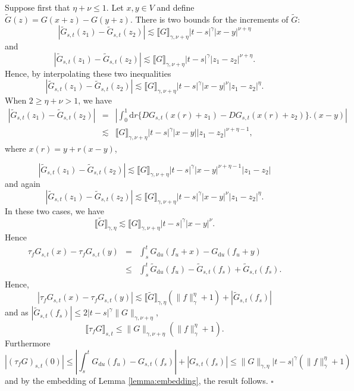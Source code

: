 \documentclass[a4paper,11pt]{article}
\newcommand{\mathd}{\mathrm{d}}
\newenvironment{proof}{{\sc Proof.}}{\hfill$\square$}
\begin{document}
\begin{proof}
  Suppose first that $\eta + \nu \leqslant 1$. Let $x,y \in V$ and define
  $\tilde{G} ( z ) =G ( x+z ) -G ( y+z )$. There is two bounds for the
  increments of $\tilde{G}$:
  \[ | \tilde{G}_{s,t} ( z_{1} ) - \tilde{G}_{s,t} ( z_{2} ) | \lesssim
     \llbracket G \rrbracket_{\gamma , \nu + \eta} | t-s |^{\gamma} | x-y
     |^{\nu + \eta} \]
  and
  \[ | \tilde{G}_{s,t} ( z_{1} ) - \tilde{G}_{s,t} ( z_{2} ) | \lesssim
     \llbracket G \rrbracket_{\gamma , \nu + \eta} | t-s |^{\gamma} | z_{1}
     -z_{2} |^{\nu + \eta} . \]
  Hence, by interpolating these two inequalities
  \[ | \tilde{G}_{s,t} ( z_{1} ) - \tilde{G}_{s,t} ( z_{2} ) | \lesssim
     \llbracket G \rrbracket_{\gamma , \nu + \eta} | t-s |^{\gamma} | x-y
     |^{\nu} | z_{1} -z_{2} |^{\eta} . \]
  When $2 \geqslant \eta + \nu >1$, we have
  \begin{eqnarray*}
    | \tilde{G}_{s,t} ( z_{1} ) - \tilde{G}_{s,t} ( z_{2} ) | & = & \left\lvert
    \int_{0}^{1} \mathd r  \{ D G_{s,t} ( x(r) +z_{1}  ) -D G_{s,t} ( x(r) +z_{2} ) \} .(x-y) \right\lvert\\
    & \lesssim & \llbracket G \rrbracket_{\gamma , \nu + \eta} | t-s
    |^{\gamma} | x-y | | z_{1} -z_{2} |^{\nu + \eta -1},
  \end{eqnarray*}
  where $x(r) = y+r(x-y)$,
  
  \[ | \tilde{G}_{s,t} ( z_{1} ) - \tilde{G}_{s,t} ( z_{2} ) | \lesssim
     \llbracket G \rrbracket_{\gamma , \nu + \eta} | t-s |^{\gamma} | x-y
     |^{\nu + \eta -1} | z_{1} -z_{2} | \]
  and again
  \[ | \tilde{G}_{s,t} ( z_{1} ) - \tilde{G}_{s,t} ( z_{2} ) | \lesssim
     \llbracket G \rrbracket_{\gamma , \nu + \eta} | t-s |^{\gamma} | x-y
     |^{\nu} | z_{1} -z_{2} |^{\eta} . \]
  In these two cases, we have
  \[ \llbracket \tilde{G} \rrbracket_{\gamma , \eta} \lesssim \llbracket G
     \rrbracket_{\gamma , \nu + \eta} | t-s |^{\gamma} | x-y |^{\nu} . \]
  Hence
  \begin{eqnarray*}
    \tau_{f} G_{s,t} ( x ) - \tau_{f} G_{s,t} ( y ) & = & \int_{s}^{t}
    G_{\mathd u} ( f_{u} +x ) -G_{\mathd u} ( f_{u} +y )\\
    & \leqslant & \int_{s}^{t} \tilde{G}_{\mathd u} ( f_{u} ) -
    \tilde{G}_{s,t} ( f_{s} ) + \tilde{G}_{s,t} ( f_{s} ).
  \end{eqnarray*}
  Hence,
  \[ | \tau_{f} G_{s,t} ( x ) - \tau_{f} G_{s,t} ( y ) | \lesssim \llbracket
     \tilde{G} \rrbracket_{\gamma , \eta} ( \| f \|^{\eta}_{\gamma} +1 ) + |
     \tilde{G}_{s,t} ( f_{s} ) | \]
  and as $| \tilde{G}_{s,t} ( f_{s} ) | \leqslant 2 | t-s |^{\gamma} \| G
  \|_{\gamma , \nu + \eta}$,
  \[ \llbracket \tau_{f} G \rrbracket_{s,t} \leqslant \| G \|_{\gamma , \nu +
     \eta} ( \| f \|^{\eta}_{\gamma} +1 ) . \]
  Furthermore
  \[ | ( \tau_{f} G )_{s,t} ( 0 ) | \leqslant \left\lvert \int_{s}^{t} G_{\mathd u}
     ( f_{u} ) -G_{s,t} ( f_{s} ) \right\lvert + | G_{s,t} ( f_{s} ) | \leqslant \|
     G \|_{\gamma , \eta} | t-s |^{\gamma} ( \| f \|_{\gamma}^{\eta} +1 ) \]
  and by the embedding of Lemma \ref{lemma:embedding}, the result follows.
\end{proof}
\end{document}
